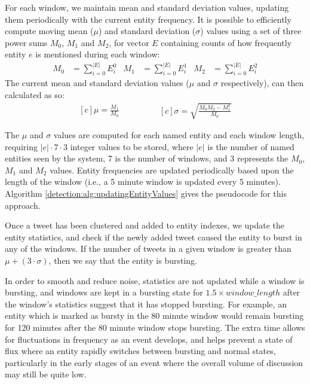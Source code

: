 For each window, we maintain mean and standard deviation values, updating them periodically with the current entity frequency.
It is possible to efficiently compute moving mean (\(\mu\)) and standard deviation (\(\sigma\)) values using a set of three power sums \(M_0\), \(M_1\) and \(M_2\), for vector $E$ containing counts of how frequently entity $e$ is mentioned during each window:
\begin{align*}
	M_0 &= \sum_{i = 0}^{|E|}{E_i^0} & M_1 &= \sum_{i = 0}^{|E|}{E_i^1} & M_2 &= \sum_{i = 0}^{|E|}{E_{i}^2}
\end{align*}
The current mean and standard deviation values (\(\mu\) and \(\sigma\) respectively), can then calculated as so:
\begin{equation*}
	\begin{aligned}[c]
		\mu = \frac{M_1}{M_0}
	\end{aligned}
	\qquad\qquad
	\begin{aligned}[c]
		\sigma = \sqrt{\frac{M_0 M_2 - M_1^2}{M_0}}
	\end{aligned}
\end{equation*}

The \(\mu\) and \(\sigma\) values are computed for each named entity and each window length, requiring $|e| \cdot 7 \cdot 3$ integer values to be stored, where $|e|$ is the number of named entities seen by the system, 7 is the number of windows, and 3 represents the $M_0$, $M_1$ and $M_2$ values.
Entity frequencies are updated periodically based upon the length of the window (i.e., a 5 minute window is updated every 5 minutes).
Algorithm \ref{detection:alg:updatingEntityValues} gives the pseudocode for this approach.

Once a tweet has been clustered and added to entity indexes, we update the entity statistics, and check if the newly added tweet caused the entity to burst in any of the windows.
If the number of tweets in a given window is greater than \(\mu + (3 \cdot \sigma)\), then we say that the entity is bursting.

In order to smooth and reduce noise, statistics are not updated while a window is bursting, and windows are kept in a bursting state for \(1.5 \times window\_length\) after the window's statistics suggest that it has stopped bursting.
For example, an entity which is marked as bursty in the 80 minute window would remain bursting for 120 minutes after the 80 minute window stops bursting.
The extra time allows for fluctuations in frequency as an event develops, and helps prevent a state of flux where an entity rapidly switches between bursting and normal states, particularly in the early stages of an event where the overall volume of discussion may still be quite low.

